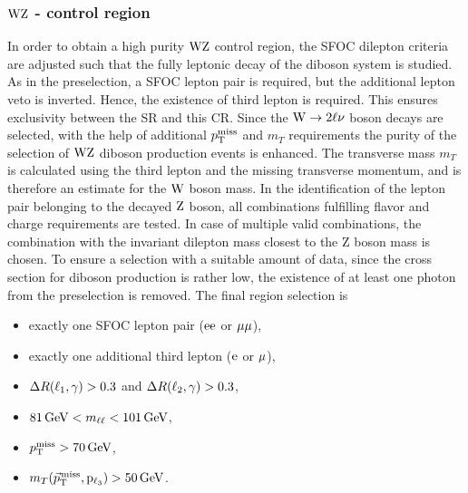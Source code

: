 \subsubsection*{$\mathrm{W}\mathrm{Z}$ - control region}
In order to obtain a high purity $\mathrm{W}\mathrm{Z}$ control region, the SFOC dilepton criteria are adjusted such that the fully leptonic decay of the diboson system is studied. As in the preselection, a SFOC lepton pair is required, but the additional lepton veto is inverted. Hence, the existence of third lepton is required. This ensures exclusivity between the SR and this CR. Since the $\mathrm{W}\to2\ell\nu$ boson decays are selected, with the help of additional $p_{\mathrm{T}}^\text{miss}$ and $m_{T}$ requirements the purity of the selection of $\mathrm{W}\mathrm{Z}$ diboson production events is enhanced. The transverse mass $m_{T}$ is calculated using the third lepton and the missing transverse momentum, and is therefore an estimate for the $\mathrm{W}$ boson mass. In the identification of the lepton pair belonging to the decayed $\mathrm{Z}$ boson, all combinations fulfilling flavor and charge requirements are tested. In case of multiple valid combinations, the combination with the invariant dilepton mass closest to the Z boson mass is chosen. To ensure a selection with a suitable amount of data, since the cross section for diboson production is rather low, the existence of at least one photon from the preselection is removed. The final region selection is
\begin{itemize}
 \item exactly one SFOC lepton pair ($\mathrm{e}\mathrm{e}$ or $\mu\mu$),
 \item exactly one additional third lepton ($\mathrm{e}$ or ${\mu}$),
 \item $\Delta R(\ell_1,\gamma)>0.3$ and $\Delta R(\ell_2,\gamma)>0.3$,
 \item $81\,\text{Ge\hspace{-.08em}V}<m_{\ell\ell}<101\,\text{Ge\hspace{-.08em}V}$,
 \item $p_{\mathrm{T}}^\text{miss}>70\,\text{Ge\hspace{-.08em}V}$,
 \item $m_{T}({\vec p}_{\mathrm{T}}^{\kern1pt\text{miss}},\mathrm{p_{\ell_3}})>50\,\text{Ge\hspace{-.08em}V}$.
\end{itemize}
